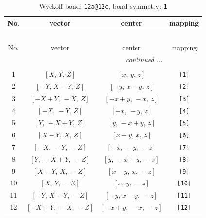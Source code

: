 \documentclass[fleqn,8pt]{jsarticle}
\begin{document}
\begin{longtable}{cccc}
\caption{Wyckoff bond: {\tt 12a@12c}, bond symmetry: {\tt 1}}
 \\
 \hline \hline
No. & vector & center & mapping \\ \hline \endfirsthead

\multicolumn{3}{l}{\tablename\ \thetable{}} \\
 \hline \hline
No. & vector & center & mapping \\ \hline \endhead

 \hline \hline
\multicolumn{3}{r}{\footnotesize\it continued ...} \\ \endfoot

 \hline \hline
\multicolumn{3}{r}{} \\ \endlastfoot

1 & $\left[ X,\, Y,\, Z \right]$ & $\left[ x,\, y,\, z \right]$ & {\tt [1]} \\ \hline
2 & $\left[ - Y,\, X - Y,\, Z \right]$ & $\left[ - y,\, x - y,\, z \right]$ & {\tt [2]} \\ \hline
3 & $\left[ - X + Y,\, - X,\, Z \right]$ & $\left[ - x + y,\, - x,\, z \right]$ & {\tt [3]} \\ \hline
4 & $\left[ - X,\, - Y,\, Z \right]$ & $\left[ - x,\, - y,\, z \right]$ & {\tt [4]} \\ \hline
5 & $\left[ Y,\, - X + Y,\, Z \right]$ & $\left[ y,\, - x + y,\, z \right]$ & {\tt [5]} \\ \hline
6 & $\left[ X - Y,\, X,\, Z \right]$ & $\left[ x - y,\, x,\, z \right]$ & {\tt [6]} \\ \hline
7 & $\left[ - X,\, - Y,\, - Z \right]$ & $\left[ - x,\, - y,\, - z \right]$ & {\tt [7]} \\ \hline
8 & $\left[ Y,\, - X + Y,\, - Z \right]$ & $\left[ y,\, - x + y,\, - z \right]$ & {\tt [8]} \\ \hline
9 & $\left[ X - Y,\, X,\, - Z \right]$ & $\left[ x - y,\, x,\, - z \right]$ & {\tt [9]} \\ \hline
10 & $\left[ X,\, Y,\, - Z \right]$ & $\left[ x,\, y,\, - z \right]$ & {\tt [10]} \\ \hline
11 & $\left[ - Y,\, X - Y,\, - Z \right]$ & $\left[ - y,\, x - y,\, - z \right]$ & {\tt [11]} \\ \hline
12 & $\left[ - X + Y,\, - X,\, - Z \right]$ & $\left[ - x + y,\, - x,\, - z \right]$ & {\tt [12]} \\
\end{longtable}
\end{document}
